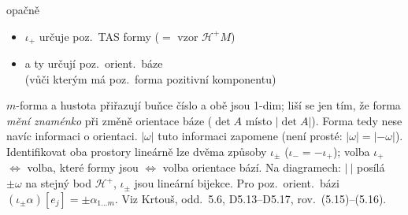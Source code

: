 \begin{center}
\end{center}

opačně
\begin{itemize}[nosep]
  \item[] $\iota_+$ určuje poz.\ TAS formy ($=$ vzor $\mathcal{H}^+M$)
  \item[] a ty určují poz.\ orient.\ báze \\
          (vůči kterým má poz.\ forma pozitivní komponentu)
\end{itemize}

\begin{vysvetleni}
$m$-forma a hustota přiřazují buňce číslo a obě jsou 1-dim; liší se jen tím, že forma \emph{mění znaménko} při změně orientace báze
($\det A$ místo $|\det A|$). Forma tedy nese navíc informaci o orientaci. $|\omega|$ tuto informaci zapomene (není prosté: $|\omega| = |{-\omega}|$).
Identifikovat oba prostory lineárně lze dvěma způsoby $\iota_\pm$ ($\iota_- = -\iota_+$); volba $\iota_+$ $\Leftrightarrow$ volba,
které formy jsou  $\Leftrightarrow$ volba orientace bází. Na diagramech: $|\ |$ posílá $\pm\omega$ na stejný bod $\mathcal H^+$,
$\iota_\pm$ jsou lineární bijekce. Pro poz.\ orient.\ bázi $(\iota_\pm\alpha)[e_j] = \pm\alpha_{1\dots m}$.
Viz Krtouš, odd.~5.6, D5.13--D5.17, rov.~(5.15)--(5.16).
\end{vysvetleni}

